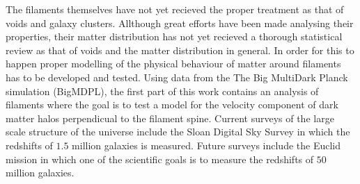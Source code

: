 The filaments themselves have not yet recieved the proper treatment as that of voids and galaxy clusters. Allthough great efforts have been made analysing their properties\cite{Libeskind_2017}, their matter distribution has not yet recieved a thorough statistical review as that of voids and the matter distribution in general. In order for this to happen proper modelling of the physical behaviour of matter around filaments has to be developed and tested. Using data from the The Big MultiDark Planck simulation (BigMDPL)\cite{Multidark_dataset}, the first part of this work contains an analysis of filaments where the goal is to test a model for the velocity component of dark matter halos perpendicual to the filament spine. Current surveys of the large scale structure of the universe include the Sloan Digital Sky Survey \cite{Eisenstein_2011} in which the redshifts of $1.5$ million galaxies is measured. Future surveys include the Euclid mission in which one of the scientific goals is to measure the redshifts of $50$ million galaxies\cite{eucliddefinition}.
